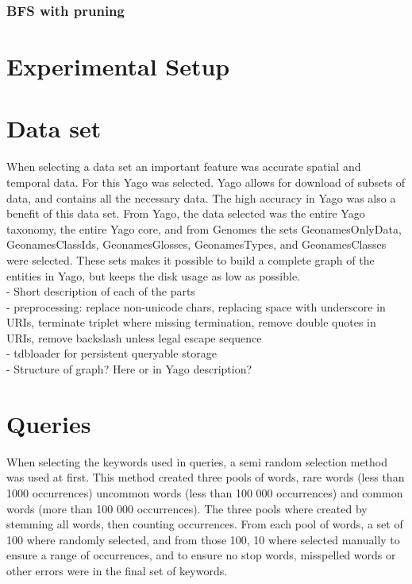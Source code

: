 \subsubsection{BFS with pruning}

\section{Experimental Setup}
\label{sec:experimentalSetup}

\section{Data set}
When selecting a data set an important feature was accurate spatial and temporal data. For this Yago was selected. Yago allows for download of subsets of data, and contains all the necessary data. The high accuracy in Yago was also a benefit of this data set. From Yago, the data selected was the entire Yago taxonomy, the entire Yago core, and from Genomes the sets GeonamesOnlyData, GeonamesClassIds, GeonamesGlosses, GeonamesTypes, and GeonamesClasses were selected. These sets makes it possible to build a complete graph of the entities in Yago, but keeps the disk usage as low as possible.\\

- Short description of each of the parts\\
- preprocessing: replace non-unicode chars, replacing space with underscore in URIs, terminate triplet where missing termination, remove double quotes in URIs, remove backslash unless legal escape sequence\\
- tdbloader for persistent queryable storage\\
- Structure of graph? Here or in Yago description?\\


\section{Queries}
When selecting the keywords used in queries, a semi random selection method was used at first. This method created three pools of words, rare words (less than 1000 occurrences) uncommon words (less than 100 000 occurrences) and common words (more than 100 000 occurrences). The three pools where created by stemming all words, then counting occurrences. From each pool of words, a set of 100 where randomly selected, and from those 100, 10 where selected manually to ensure a range of occurrences, and to ensure no stop words, misspelled words or other errors were in the final set of keywords.\\

